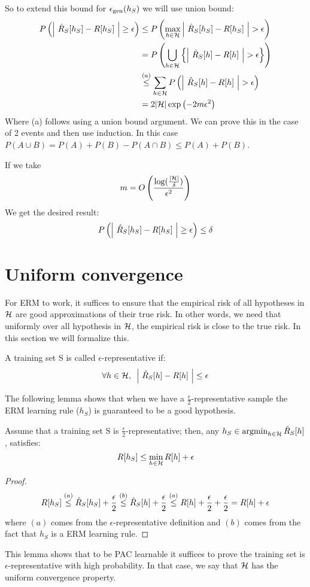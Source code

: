 \documentclass{article}
\DeclareMathOperator*{\argmin}{argmin}
\begin{document}
So to extend this bound for $\epsilon_{\text{gen}}(h_S)$ we will use union bound:
\begin{align*}
     P\left( \left| \ \hat{R}_S[h_S] - R[h_S] \ \right| \ge \epsilon\right) &\le P\left( \max_{h \in \mathcal{H}} \left| \ \hat{R}_S[h_S] - R[h_S] \ \right| > \epsilon\right) \\
     &= P\left( \bigcup_{h \in \mathcal{H}} \left\{ \left| \ \hat{R}_S[h] - R[h] \ \right| > \epsilon \right\} \right) \\
     &\overset{(a)}{\le} \sum_{h \in \mathcal{H}}  P\left(\left| \ \hat{R}_S[h] - R[h] \ \right| > \epsilon\right)\\
     &=2|\mathcal{H}|\exp\left(-2 m \epsilon^2\right)
\end{align*}
Where (a) follows using a union bound argument. We can prove this in the case of 2 events and then use induction. In this case $P(A \cup B) = P(A) + P(B) - P(A \cap B) \le P(A) + P(B)$.

If we take $$m = O\left(\frac{\log(\frac{|\mathcal{H}|}{\delta})}{\epsilon^2}\right)$$
We get the desired result:
\begin{align*}
    P\left( \left| \ \hat{R}_S[h_S] - R[h_S] \ \right| \ge \epsilon\right) \le \delta
\end{align*}

\section{Uniform convergence}
For ERM to work, it suffices to ensure that the empirical risk of all hypotheses in $\mathcal{H}$ are good approximations of their true risk. In other words, we need that uniformly over all hypothesis in $\mathcal{H}$, the empirical risk is close to the true risk. In this section we will formalize this.
\begin{defn}
A training set S is called $\epsilon$-representative  if:
$$
\forall h \in \HH, \,\,\, \left| \ \Rhat[h] - R[h] \ \right| \le \epsilon
$$
\end{defn}
The following lemma shows that when we have a $\frac{\epsilon}{2}$-representative sample the ERM learning rule ($h_S$) is guaranteed to be a good hypothesis.
\begin{lemma}
Assume that a training set S is $\frac{\epsilon}{2}$-representative; then, any $h_S \in \argmin_{h \in \HH} \Rhat[h]$, satisfies:
$$
R[h_S] \leq \underset{h \in \mathcal{H}}{\min}\, R[h] + \epsilon
$$
\end{lemma}
\begin{proof}
$$
R[h_S] \overset{(a)}{\leq} \hat{R}_S[h_S]  + \frac{\epsilon}{2} \overset{(b)}{\leq} \hat{R}_S[h]  + \frac{\epsilon}{2} \overset{(a)}{\leq} R[h] + \frac{\epsilon}{2} + \frac{\epsilon}{2} = R[h] + \epsilon
$$
where $(a)$ comes from the $\epsilon$-representative definition and $(b)$ comes from the fact that $h_S$ is a ERM learning rule.
\end{proof}
This lemma shows that to be PAC learnable it suffices to prove the training set is $\epsilon$-representative with high probability. In that case, we say that $\mathcal{H}$ has the uniform convergence property. 
\end{document}
